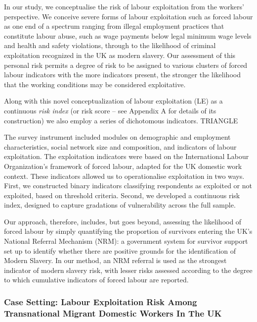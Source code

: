 \documentclass[
  12pt,
  letterpaper,
  DIV=11,
  numbers=noendperiod]{scrartcl}
\theoremstyle{plain}
\theoremstyle{definition}
\begin{document}
In our study, we conceptualise the risk of labour exploitation from the
workers' perspective. We conceive severe forms of labour exploitation
such as forced labour as one end of a spectrum ranging from illegal
employment practices that constitute labour abuse, such as wage payments
below legal minimum wage levels and health and safety violations,
through to the likelihood of criminal exploitation recognized in the UK
as modern slavery. Our assessment of this personal risk permits a degree
of risk to be assigned to various clusters of forced labour indicators
with the more indicators present, the stronger the likelihood that the
working conditions may be considered exploitative.

Along with this novel conceptualization of labour exploitation (LE) as a
continuous \emph{risk index} (or risk score -- see Appendix A for
details of its construction) we also employ a series of dichotomous
indicators. TRIANGLE

The survey instrument included modules on demographic and employment
characteristics, social network size and composition, and indicators of
labour exploitation. The exploitation indicators were based on the
International Labour Organization's framework of forced labour, adapted
for the UK domestic work context. These indicators allowed us to
operationalise exploitation in two ways. First, we constructed binary
indicators classifying respondents as exploited or not exploited, based
on threshold criteria. Second, we developed a continuous risk index,
designed to capture gradations of vulnerability across the full sample.

Our approach, therefore, includes, but goes beyond, assessing the
likelihood of forced labour by simply quantifying the proportion of
survivors entering the UK's National Referral Mechanism (NRM): a
government system for survivor support set up to identify whether there
are positive grounds for the identification of Modern Slavery. In our
method, an NRM referral is used as the strongest indicator of modern
slavery risk, with lesser risks assessed according to the degree to
which cumulative indicators of forced labour are reported.

\subsubsection{Case Setting: Labour Exploitation Risk Among
Transnational Migrant Domestic Workers In The
UK}\label{case-setting-labour-exploitation-risk-among-transnational-migrant-domestic-workers-in-the-uk}
\end{document}
